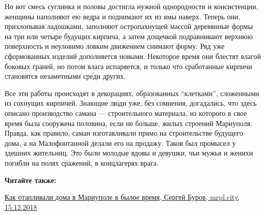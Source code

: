 Но вот смесь суглинка и половы достигла нужной однородности и консистенции,
женщины наполняют ею ведра и поднимают их из ямы наверх. Теперь они,
прихлопывая ладошками, заполняют остропахнущей массой деревянные формы на три
или четыре будущих кирпича, а затем дощечкой подравнивают верхнюю поверхность и
неуловимо ловким движением снимают форму. Ряд уже сформованных изделий
дополняется новыми. Некоторое время они блестят влагой боковых граней, но потом
влага испаряется, и только что сработанные кирпичи становятся незаметными среди
других.

Все эти работы происходят в декорациях, образованных \enquote{клетками}, сложенными из
сохнущих кирпичей. Знающие люди уже, без сомнения, догадались, что здесь
описано производство самана — строительного материала, из которого в свое время
была сооружена половина, если не больше, жилых строений Мариуполя. Правда, как
правило, саман изготавливали прямо на строительстве будущего дома, а на
Малофонтанной делали его на продажу. Таков был промысел у здешних жительниц.
Это были молодые вдовы и девушки, чьи мужья и женихи погибли на полях сражений,
в концлагерях врага.

\vspace{0.5cm}
\begin{minipage}{0.9\textwidth}
\textbf{Читайте также:}

\href{https://archive.org/details/15_12_2018.sergij_burov.mrpl_city.kak_otaplivali_doma_v_mariupole_v_byloe_vremja}{%
Как отапливали дома в Мариуполе в былое время, Сергей Буров, mrpl.city, 15.12.2018}
\end{minipage}
\vspace{0.5cm}
